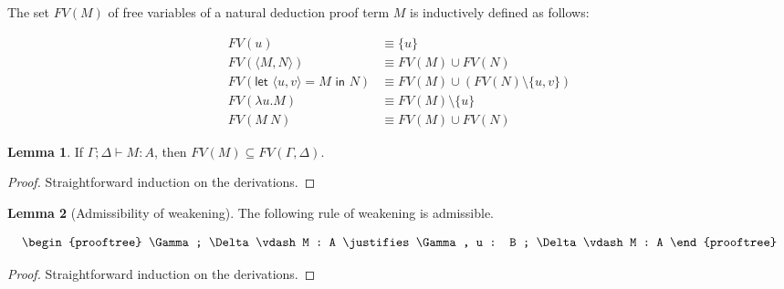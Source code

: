 \documentclass{article}
\theoremstyle{definition}
\newtheorem{lemma}{Lemma}
\newcommand{\tyj}[2]{#1 : #2}
\begin{document}
\begin{definition}
  The set $FV(M)$ of free variables of a natural deduction proof term $M$ is
  inductively defined as follows:

  \begin{align*}
    FV(u) & \equiv \{ u \} \\
    FV(\langle M, N \rangle) & \equiv FV(M) \cup FV(N) \\
    FV(\textsf{let }\langle u,v \rangle = M \textsf{ in } N) & \equiv FV(M) \cup (FV(N) \setminus \{ u, v \}) \\
    FV(\lambda u . M) & \equiv FV(M) \setminus \{ u \} \\
    FV(M\ N) & \equiv FV(M) \cup FV(N)
  \end{align*}
\end{definition}

\begin{lemma}
  If $\Gamma ; \Delta \vdash \tyj{M}{A}$, then
  $FV(M) \subseteq FV(\Gamma, \Delta)$.
\end{lemma}
\begin{proof}
  Straightforward induction on the derivations.
\end{proof}

\begin{lemma}[Admissibility of weakening]
  The following rule of weakening is admissible.

  \[
    \begin{prooftree}
      \Gamma ; \Delta \vdash \tyj{M}{A}
      \justifies
      \Gamma, \tyj{u}{B} ; \Delta \vdash \tyj{M}{A}
    \end{prooftree}
  \]
\end{lemma}
\begin{proof}
  Straightforward induction on the derivations.
\end{proof}
\end{document}
